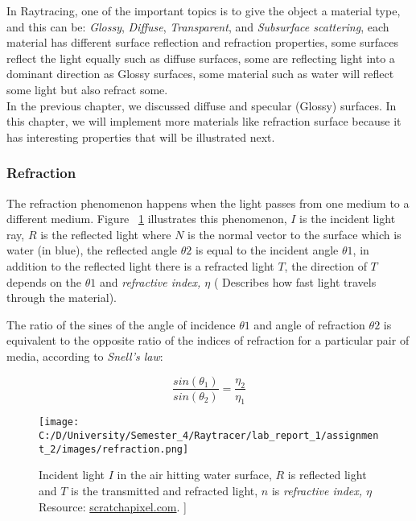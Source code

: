 \documentclass{article}
\begin{document}
	In Raytracing, one of the important topics is to give the object a material type, and this can be: \textit{Glossy}, \textit{Diffuse}, \textit{Transparent}, and\textit{ Subsurface
	scattering}, each material has different surface reflection and refraction properties, some surfaces reflect the light equally such as diffuse surfaces, some are reflecting light into a dominant direction as Glossy surfaces, some material such as water will reflect some light but also refract some.
	\\ 
	In the previous chapter, we discussed diffuse and specular (Glossy) surfaces. In this chapter, we will implement more materials like refraction surface because it has interesting properties that will be illustrated next. 
	
	\subsubsection{Refraction}
	The refraction phenomenon happens when the light passes from one medium to a different medium.
	Figure ~\ref{fig:refraction} illustrates this phenomenon, $I$ is the incident light ray, $R$ is the reflected light where $N$ is the normal vector to the surface which is water (in blue), the reflected angle  $\theta2$ is equal to the incident angle $\theta1$, in addition to the reflected light there is a refracted light $T$, the direction of $T$ depends on the $\theta1$ and \textit{refractive index, $\eta$} ( Describes how fast light travels through the material).
	
	The ratio of the sines of the angle of incidence  $\theta1$ and angle of refraction $\theta2$ is equivalent to the opposite ratio of the indices of refraction for a particular pair of media, according to \textit{Snell's law}:
	
	
	\begin{equation}
		\frac{sin(\theta_1)}{sin(\theta_2)} = \frac{\eta_2}{\eta_1} 
	\end{equation}
	
	
	\begin{figure}[H]
		\begin{center}
			\texttt{[image: C:/D/University/Semester\_4/Raytracer/lab\_report\_1/assignment\_2/images/refraction.png]}
			
			\caption{Incident light $I$ in the air hitting water surface, $R$ is reflected light and $T$ is the transmitted and refracted light, $n$ is \textit{refractive index, $\eta$  } Resource: \href{https://www.scratchapixel.com/images/upload/shading-intro/shad-refraction6.png?}{scratchapixel.com}.
				]}
			\label{fig:refraction}
		\end{center}
	\end{figure}
	
\end{document}
